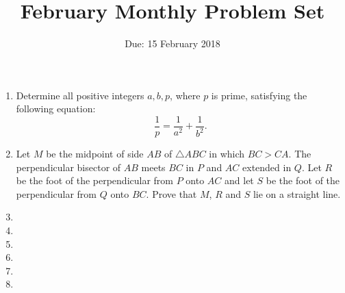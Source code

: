 \documentclass[12pt]{article}
\title{February Monthly Problem Set}
\author{Due: 15 February 2018}
\date{}
\begin{document}
 \maketitle

\begin{enumerate}

\item %
Determine all positive integers $a,b,p$, where $p$ is prime, satisfying the following equation:
  \[ \frac{1}{p} = \frac{1}{a^2} + \frac{1}{b^2}. \]


\item %
Let $M$ be the midpoint of side $AB$ of $\triangle ABC$ in which $BC>CA$. The perpendicular bisector of $AB$ meets $BC$ in $P$ and $AC$ extended in $Q$. Let $R$ be the foot of the perpendicular from $P$ onto $AC$ and let $S$ be the foot of the perpendicular from $Q$ onto $BC$. Prove that $M$, $R$ and $S$ lie on a straight line.


\item %


\item %


\item %


\item %


\item %


\item %


\end{enumerate}
\end{document}
